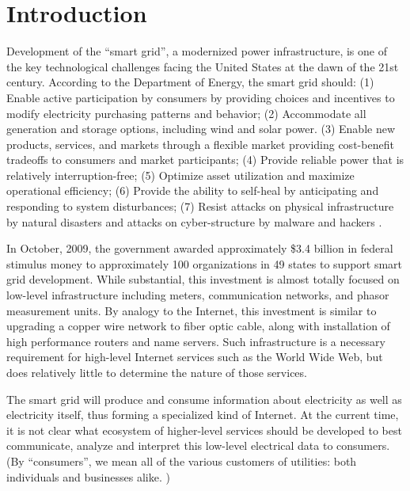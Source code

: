 
\section{Introduction}

Development of the ``smart grid'', a modernized power infrastructure, is
one of the key technological challenges facing the United States at the
dawn of the 21st century. According to the Department of Energy, the smart
grid should: (1) Enable active participation by consumers by providing
choices and incentives to modify electricity purchasing patterns and
behavior; (2) Accommodate all generation and storage options, including
wind and solar power.  (3) Enable new products, services, and markets
through a flexible market providing cost-benefit tradeoffs to consumers and
market participants; (4) Provide reliable power that is relatively
interruption-free; (5) Optimize asset utilization and maximize operational
efficiency; (6) Provide the ability to self-heal by anticipating and
responding to system disturbances; (7) Resist attacks on physical
infrastructure by natural disasters and attacks on cyber-structure by
malware and hackers \cite{NETL:GridCharacteristics}.

In October, 2009, the government awarded approximately \$3.4 billion in
federal stimulus money to approximately 100 organizations in 49 states to
support smart grid development.  While substantial, this investment is
almost totally focused on low-level infrastructure including meters,
communication networks, and phasor measurement units.  By analogy to the
Internet, this investment is similar to upgrading a copper wire network to
fiber optic cable, along with installation of high performance routers and
name servers.  Such infrastructure is a necessary requirement for
high-level Internet services such as the World Wide Web, but does
relatively little to determine the nature of those services.

The smart grid will produce and consume information about electricity as
well as electricity itself, thus forming a specialized kind of Internet. At
the current time, it is not clear what ecosystem of higher-level services
should be developed to best communicate, analyze and interpret this
low-level electrical data to consumers.  (By ``consumers'', we mean all of
the various customers of utilities: both individuals and businesses
alike. )


